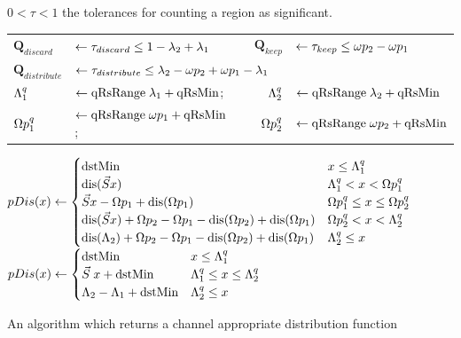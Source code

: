  \begin{algorithm}[H]
  \begin{algorithmic}
       \State \phantom{Require} $0<\tau<1$ the tolerances for counting a region as significant.
       \State \begin{tabular}{llcrl}
       $\mathbf{Q}_{discard} $    &  $\gets \tau_{discard}     \le    1-\lambda_2 + \lambda_1$ & \quad\quad&
              $\mathbf{Q}_{keep} $        & $\gets \tau_{keep}         \le     \omega p_2 - \omega p_1$\\
       $\mathbf{Q}_{distribute}$ & \multicolumn{4}{l}{$\gets \tau_{distribute}  \le    \lambda_2 - \omega p_2 + \omega p_1 - \lambda_1$} \\
       $\Lambda_1^{q}$ &$\gets \text{qRsRange} \; \lambda_1 + \text{qRsMin}$; & \quad\quad &
       $\Lambda_2^{q}$ &$\gets \text{qRsRange} \; \lambda_2 + \text{qRsMin}$ \\
       $\Omega p_1^{q}$    &$\gets \text{qRsRange} \; \omega p_1   + \text{qRsMin}$; & \quad\quad &
       $\Omega p_2^{q}$    &$\gets \text{qRsRange} \; \omega p_2   + \text{qRsMin}$ 
       \end{tabular} \;
         \State $
          pDis(x) \gets \begin{cases}
          \dstMin & x \le \Discard_1^q \\
          \text{dis}(\Scale x) & \Discard_1^q < x < \eKeep_1^q \\
          \Scale x - \eKeep_1 + \text{dis}(\eKeep_1) & \eKeep_1^q \le x \le \eKeep_2^q  \\
          \text{dis}(\Scale x) + \eKeep_2 - \eKeep_1 - \text{dis}(\eKeep_2) + \text{dis}(\eKeep_1)  & \eKeep_2^q < x < \Discard_2^q  \\
          \text{dis}(\Discard_2) + \eKeep_2 - \eKeep_1 - \text{dis}(\eKeep_2) + \text{dis}(\eKeep_1) & \Discard_2^q \le x\\
          \end{cases}   $
          \State  
          $ pDis(x) \gets \begin{cases}
           \dstMin & x \le \Discard_1^q \\
           \Scale \; x  + \dstMin  & \Discard_1^q \le x \le \Discard_2^q  \\
           \Discard_2 - \Discard_1 + \dstMin  & \Discard_2^q \le x\\
           \end{cases}$
\end{algorithmic}
  \caption{An algorithm which returns a channel appropriate distribution function}
\end{algorithm}
